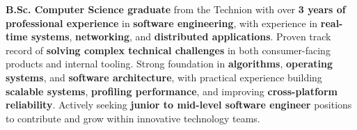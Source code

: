 

\begin{cvparagraph}

\textbf{B.Sc. Computer Science graduate} from the Technion with over \textbf{3 years of professional experience} in \textbf{software engineering}, with experience in \textbf{real-time systems}, \textbf{networking}, and \textbf{distributed applications}. Proven track record of \textbf{solving complex technical challenges} in both consumer-facing products and internal tooling. Strong foundation in \textbf{algorithms}, \textbf{operating systems}, and \textbf{software architecture}, with practical experience building \textbf{scalable systems}, \textbf{profiling performance}, and improving \textbf{cross-platform reliability}. Actively seeking \textbf{junior to mid-level software engineer} positions to contribute and grow within innovative technology teams.

\end{cvparagraph}